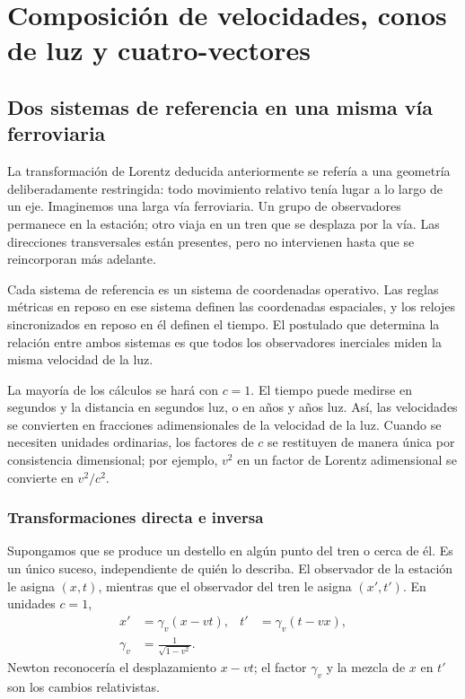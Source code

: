\chapter{Composición de velocidades, conos de luz y cuatro-vectores}

\section{Dos sistemas de referencia en una misma vía ferroviaria}

La transformación de Lorentz deducida anteriormente se refería a una geometría deliberadamente restringida: todo movimiento relativo tenía lugar a lo largo de un eje. Imaginemos una larga vía ferroviaria. Un grupo de observadores permanece en la estación; otro viaja en un tren que se desplaza por la vía. Las direcciones transversales están presentes, pero no intervienen hasta que se reincorporan más adelante.

Cada sistema de referencia es un sistema de coordenadas operativo. Las reglas métricas en reposo en ese sistema definen las coordenadas espaciales, y los relojes sincronizados en reposo en él definen el tiempo. El postulado que determina la relación entre ambos sistemas es que todos los observadores inerciales miden la misma velocidad de la luz.

La mayoría de los cálculos se hará con \(c=1\). El tiempo puede medirse en segundos y la distancia en segundos luz, o en años y años luz. Así, las velocidades se convierten en fracciones adimensionales de la velocidad de la luz. Cuando se necesiten unidades ordinarias, los factores de \(c\) se restituyen de manera única por consistencia dimensional; por ejemplo, \(v^2\) en un factor de Lorentz adimensional se convierte en \(v^2/c^2\).

\subsection{Transformaciones directa e inversa}

Supongamos que se produce un destello en algún punto del tren o cerca de él. Es un único suceso, independiente de quién lo describa. El observador de la estación le asigna \((x,t)\), mientras que el observador del tren le asigna \((x',t')\). En unidades \(c=1\),
\begin{align}
x'&=\gamma_v(x-vt),&
t'&=\gamma_v(t-vx),
\label{eq:sr2-direct}\\
\gamma_v&=\frac{1}{\sqrt{1-v^2}}.
\end{align}
Newton reconocería el desplazamiento \(x-vt\); el factor \(\gamma_v\) y la mezcla de \(x\) en \(t'\) son los cambios relativistas.

